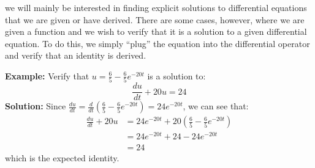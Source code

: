  we will mainly be interested in finding explicit solutions to differential equations that we are given or have derived.  There are some cases, however, where we are given a function and we wish to verify that it is a solution to a given differential equation.  To do this, we simply ``plug'' the equation into the differential operator and verify that an identity is derived.

\begin{example}
\textbf{Example:} Verify that $u = \frac{6}{5} - \frac{6}{5}e^{-20t}$ is a solution to:
$$\frac{du}{dt} + 20u = 24$$
\vspace{0.5cm}
\textbf{Solution:}
Since $\frac{du}{dt} = \frac{d}{dt}(\frac{6}{5} - \frac{6}{5}e^{-20t}) = 24e^{-20t}$, we can see that:
\begin{align*}
\frac{du}{dt} + 20u &= 24e^{-20t} + 20(\frac{6}{5} - \frac{6}{5}e^{-20t}) \\
&= 24e^{-20t} + 24 - 24e^{-20t} \\
&=24
\end{align*} 
which is the expected identity.
\end{example} 

